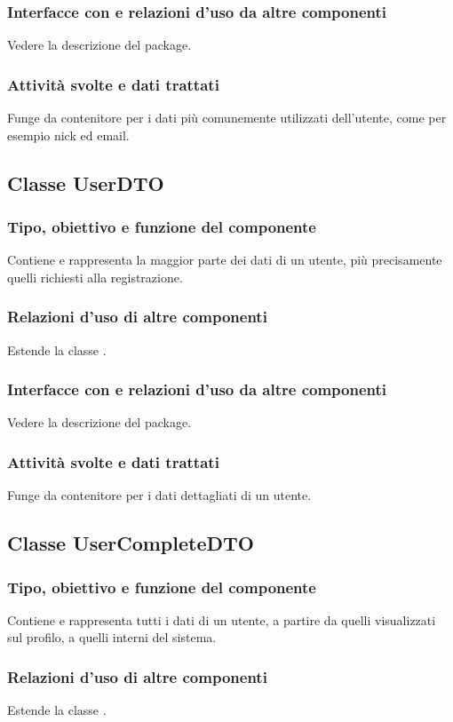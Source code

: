 \subsubsection*{Interfacce con e relazioni d'uso da altre componenti}
Vedere la descrizione del package.
\subsubsection*{Attivit\`a svolte e dati trattati}
Funge da contenitore per i dati pi\`u comunemente utilizzati dell'utente, come
per esempio nick ed email.

\subsection{Classe UserDTO}
\subsubsection*{Tipo, obiettivo e funzione del componente}
Contiene e rappresenta la maggior parte dei dati di un utente, pi\`u
precisamente quelli richiesti alla registrazione.
\subsubsection*{Relazioni d'uso di altre componenti}
Estende la classe .
\subsubsection*{Interfacce con e relazioni d'uso da altre componenti}
Vedere la descrizione del package.
\subsubsection*{Attivit\`a svolte e dati trattati}
Funge da contenitore per i dati dettagliati di un utente.

\subsection{Classe UserCompleteDTO}
\subsubsection*{Tipo, obiettivo e funzione del componente}
Contiene e rappresenta tutti i dati di un utente, a partire da quelli
visualizzati sul profilo, a quelli interni del sistema.
\subsubsection*{Relazioni d'uso di altre componenti}
Estende la classe .
